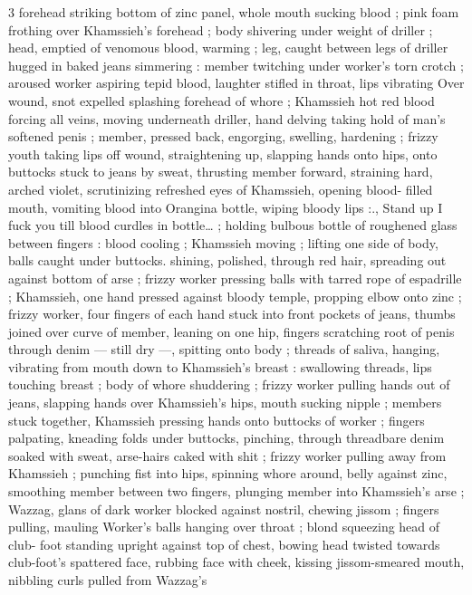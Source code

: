 3 forehead striking bottom of zinc panel, whole mouth sucking blood 
; pink foam frothing over Khamssieh's forehead ; body shivering 
under weight of driller ; head, emptied of venomous blood, warming 
; leg, caught between legs of driller hugged in baked jeans 
simmering : member twitching under worker's torn crotch ; aroused 
worker aspiring tepid blood, laughter stifled in throat, lips vibrating 
Over wound, snot expelled splashing forehead of whore ; Khamssieh 
hot red blood forcing all veins, moving underneath driller, hand 
delving taking hold of man's softened penis ; member, pressed back, 
engorging, swelling, hardening ; frizzy youth taking lips off wound, 
straightening up, slapping hands onto hips, onto buttocks stuck to 
jeans by sweat, thrusting member forward, straining hard, arched 
violet, scrutinizing refreshed eyes of Khamssieh, opening blood- 
filled mouth, vomiting blood into Orangina bottle, wiping bloody lips 
:{\gl}., Stand up{\td} I fuck you till blood curdles in bottle{\ldots} ; holding 
bulbous bottle of roughened glass between fingers : blood cooling ; 
Khamssieh moving ; lifting one side of body, balls caught under 
buttocks. shining, polished, through red hair, spreading out against 
bottom of arse ; frizzy worker pressing balls with tarred rope of 
espadrille ; Khamssieh, one hand pressed against bloody temple, 
propping elbow onto zinc ; frizzy worker, four fingers of each hand 
stuck into front pockets of jeans, thumbs joined over curve of 
member, leaning on one hip, fingers scratching root of penis through 
denim --- still dry ---, spitting onto body ; threads of saliva, hanging, 
vibrating from mouth down to Khamssieh's breast : swallowing 
threads, lips touching breast ; body of whore shuddering ; frizzy 
worker pulling hands out of jeans, slapping hands over Khamssieh's 
hips, mouth sucking nipple ; members stuck together, Khamssieh 
pressing hands onto buttocks of worker ; fingers palpating, kneading 
folds under buttocks, pinching, through threadbare denim soaked 
with sweat, arse-hairs caked with shit ; frizzy worker pulling away 
from Khamssieh ; punching fist into hips, spinning whore around, 
belly against zinc, smoothing member between two fingers, plunging 
member into Khamssieh's arse ; Wazzag, glans of dark worker 
blocked against nostril, chewing jissom ; fingers pulling, mauling 
Worker's balls hanging over throat ; blond squeezing head of club- 
foot standing upright against top of chest, bowing head twisted 
towards club-foot's spattered face, rubbing face with cheek, kissing 
jissom-smeared mouth, nibbling curls pulled from Wazzag's 

